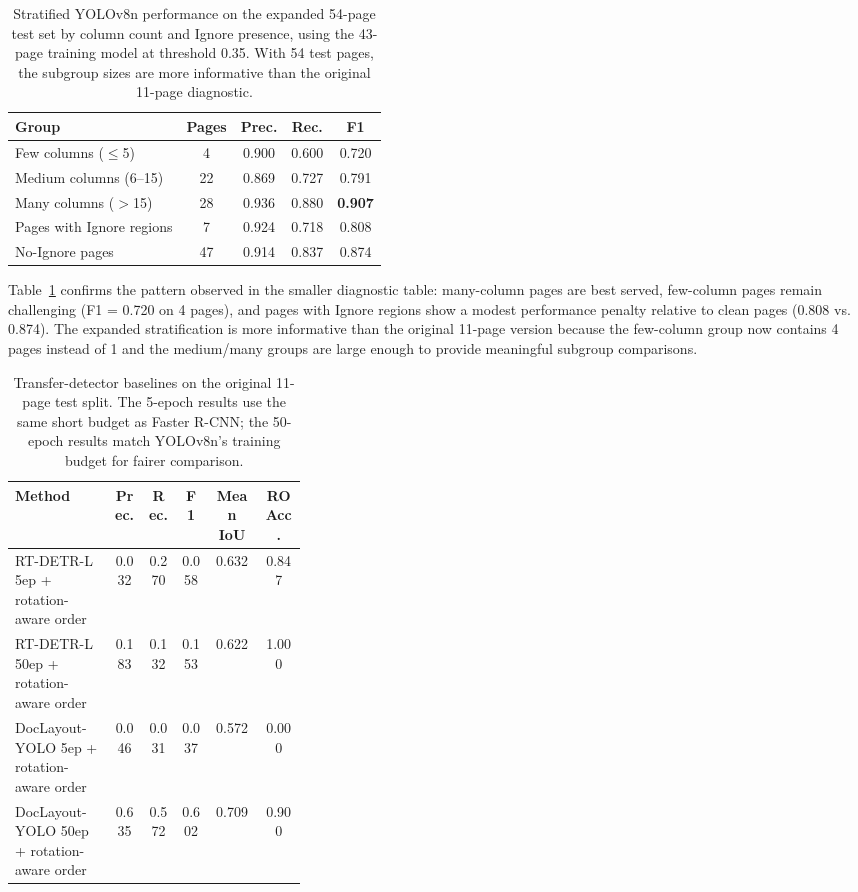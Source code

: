 \documentclass[pdflatex,sn-mathphys-num]{sn-jnl}
\begin{document}
\begin{table}[t]
\centering
\scriptsize\setlength{\tabcolsep}{3pt}
\caption{Stratified YOLOv8n performance on the expanded 54-page test set by column count and Ignore presence, using the 43-page training model at threshold 0.35. With 54 test pages, the subgroup sizes are more informative than the original 11-page diagnostic.}
\label{tab:stratified_expanded}
\begin{tabular}{lcccc}
\toprule
Group & Pages & Prec. & Rec. & F1 \\
\midrule
Few columns ($\leq$5) & 4 & 0.900 & 0.600 & 0.720 \\
Medium columns (6--15) & 22 & 0.869 & 0.727 & 0.791 \\
Many columns ($>$15) & 28 & 0.936 & 0.880 & \textbf{0.907} \\
Pages with Ignore regions & 7 & 0.924 & 0.718 & 0.808 \\
No-Ignore pages & 47 & 0.914 & 0.837 & 0.874 \\
\bottomrule
\end{tabular}
\end{table}

Table~\ref{tab:stratified_expanded} confirms the pattern observed in the smaller diagnostic table: many-column pages are best served, few-column pages remain challenging (F1 = 0.720 on 4 pages), and pages with Ignore regions show a modest performance penalty relative to clean pages (0.808 vs. 0.874). The expanded stratification is more informative than the original 11-page version because the few-column group now contains 4 pages instead of 1 and the medium/many groups are large enough to provide meaningful subgroup comparisons.

\begin{table}[t]
\centering
\scriptsize\setlength{\tabcolsep}{3pt}
\caption{Transfer-detector baselines on the original 11-page test split. The 5-epoch results use the same short budget as Faster R-CNN; the 50-epoch results match YOLOv8n's training budget for fairer comparison.}
\label{tab:transfer_baselines}
\begin{tabular}{p{0.34\linewidth}ccccc}
\toprule
Method & Prec. & Rec. & F1 & Mean IoU & RO Acc. \\
\midrule
RT-DETR-L 5ep + rotation-aware order & 0.032 & 0.270 & 0.058 & 0.632 & 0.847 \\
RT-DETR-L 50ep + rotation-aware order & 0.183 & 0.132 & 0.153 & 0.622 & 1.000 \\
DocLayout-YOLO 5ep + rotation-aware order & 0.046 & 0.031 & 0.037 & 0.572 & 0.000 \\
DocLayout-YOLO 50ep + rotation-aware order & 0.635 & 0.572 & 0.602 & 0.709 & 0.900 \\
\bottomrule
\end{tabular}
\end{table}
\end{document}
